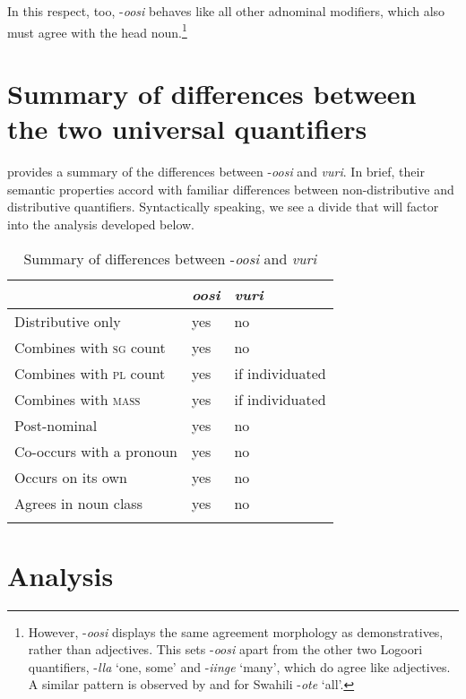 \documentclass[output=paper]{langsci/langscibook}
\begin{document}
In this respect, too, -\textit{oosi} behaves like all other adnominal modifiers, which also must agree with the head noun.\footnote{However, -\textit{oosi} displays the same agreement morphology as demonstratives, rather than adjectives. This sets -\textit{oosi} apart from the other two Logoori quantifiers, -\textit{lla} ‘one, some’ and -\textit{iinge} ‘many’, which do agree like adjectives. A similar pattern is observed by \citet{Krifka1995} and \citet{ZerbianKrifka2008} for Swahili -\textit{ote} ‘all’.
} 

\section{Summary of differences between the two universal quantifiers}

 provides a summary of the differences between -\textit{oosi} and \textit{vuri}. In brief, their semantic properties accord with familiar differences between non-distributive and distributive quantifiers. Syntactically speaking, we see a divide that will factor into the analysis developed below.

\begin{table}
\caption{Summary of differences between -\textit{oosi} and \textit{vuri}}
\label{tab:2}


\begin{tabularx}{\textwidth}{p{5cm}XX} 
\lsptoprule
& \textit{oosi} &   \textit{vuri}\\
\midrule
{Distributive only}& yes   & no \\
{Combines with \textsc{sg} count}& yes   &  no\\
{Combines with \textsc{pl} count}& yes   & if individuated\\
{Combines with \textsc{mass}}& yes   & if individuated\\
Post-nominal& yes   & no \\
Co-occurs with a pronoun& yes   & no \\
Occurs on its own& yes   & no \\
Agrees in noun class & yes   & no  \\
\lspbottomrule
\end{tabularx}
\end{table}

\section{Analysis}
\end{document}
